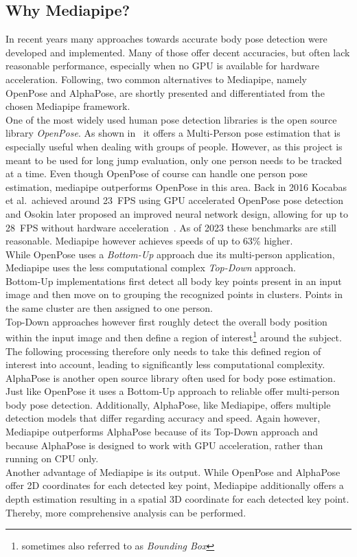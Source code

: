 \subsection{Why Mediapipe?}\label{subsec:2_why_mediapipe}
In recent years many approaches towards accurate body pose detection were 
developed and implemented.
Many of those offer decent accuracies, but often lack reasonable performance,
especially when no \ac{GPU} is available for hardware acceleration.
Following, two common alternatives to Mediapipe, namely OpenPose and AlphaPose,
are shortly presented and differentiated from the chosen Mediapipe framework.\\
One of the most widely used human pose detection libraries is the open source 
library \textit{OpenPose}.
As shown in~\cite{openPose} it offers a Multi-Person pose estimation that is 
especially useful when dealing with groups of people.
However, as this project is meant to be used for long jump evaluation, only one 
person needs to be tracked at a time.
Even though OpenPose of course can handle one person pose estimation, 
mediapipe outperforms OpenPose in this area.
Back in 2016 Kocabas et al.~achieved around 23~FPS using \ac{GPU} accelerated
OpenPose pose detection~\cite{openPose_speed_gpu} and Osokin later proposed an
improved neural network design, allowing for up to 28~FPS without hardware 
acceleration~\cite{openPose_speed_cpu}.
As of 2023 these benchmarks are still reasonable.
Mediapipe however achieves speeds of up to 63\% higher.\\
While OpenPose uses a \textit{Bottom-Up} approach due its multi-person 
application, Mediapipe uses the less computational complex \textit{Top-Down} 
approach.\\
Bottom-Up implementations first detect all body key points present in an input
image and then move on to grouping the recognized points in clusters.
Points in the same cluster are then assigned to one person.\\
Top-Down approaches however first roughly detect the overall body position 
within the input image and then define a region of interest\footnote{sometimes
also referred to as \textit{Bounding Box}} around the subject.
The following processing therefore only needs to take this defined region of 
interest into account, leading to significantly less computational complexity.\\
AlphaPose is another open source library often used for body pose estimation.
Just like OpenPose it uses a Bottom-Up approach to reliable offer multi-person
body pose detection.
Additionally, AlphaPose, like Mediapipe, offers multiple detection models that 
differ regarding accuracy and speed.
Again however, Mediapipe outperforms AlphaPose because of its Top-Down approach
and because AlphaPose is designed to work with \ac{GPU} acceleration, rather 
than running on \ac{CPU} only.\\
Another advantage of Mediapipe is its output.
While OpenPose and AlphaPose offer 2D coordinates for each detected key point,
Mediapipe additionally offers a depth estimation resulting in a spatial 3D 
coordinate for each detected key point.
Thereby, more comprehensive analysis can be performed.   

